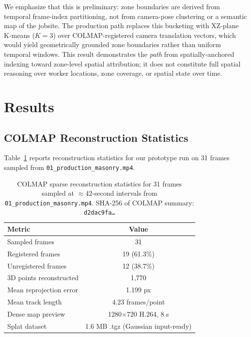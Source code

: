 \documentclass[sigconf,nonacm]{acmart}
\begin{document}
We emphasize that this is preliminary: zone boundaries are derived from temporal
frame-index partitioning, not from camera-pose clustering or a semantic map of
the jobsite. The production path replaces this bucketing with XZ-plane K-means
($K=3$) over COLMAP-registered camera translation vectors, which would yield
geometrically grounded zone boundaries rather than uniform temporal windows.
This result demonstrates the \emph{path} from spatially-anchored indexing toward
zone-level spatial attribution; it does not constitute full spatial reasoning
over worker locations, zone coverage, or spatial state over time.

\section{Results}

\subsection{COLMAP Reconstruction Statistics}

Table~\ref{tab:colmap} reports reconstruction statistics for our prototype run
on 31 frames sampled from \texttt{01\_production\_masonry.mp4}.

\begin{table}[h]
\centering
\caption{COLMAP sparse reconstruction statistics for 31 frames sampled at
$\approx$42-second intervals from \texttt{01\_production\_masonry.mp4}.
SHA-256 of COLMAP summary: \texttt{d2dac9fa\ldots}}
\begin{tabular}{lc}
\toprule
Metric & Value \\
\midrule
Sampled frames & 31 \\
Registered frames & 19 (61.3\%) \\
Unregistered frames & 12 (38.7\%) \\
3D points reconstructed & 1,770 \\
Mean reprojection error & 1.199 px \\
Mean track length & 4.23 frames/point \\
Dense map preview & 1280$\times$720 H.264, 8 s \\
Splat dataset & 1.6 MB .tgz (Gaussian input-ready) \\
\bottomrule
\end{tabular}
\label{tab:colmap}
\end{table}
\end{document}

